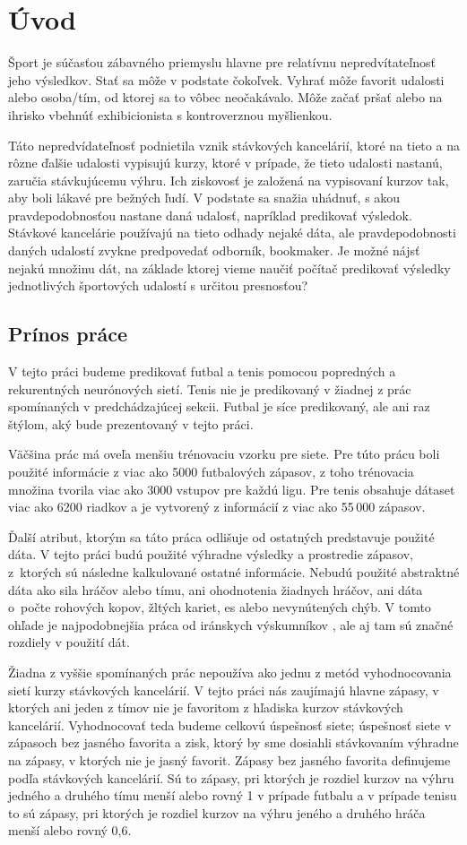 \chapter*{Úvod}
Šport je súčasťou zábavného priemyslu hlavne pre relatívnu nepredvítateľnosť jeho výsledkov. 
Stať sa môže v podstate čokoľvek. 
Vyhrať môže favorit udalosti alebo osoba/tím, od ktorej sa to vôbec neočakávalo.
Môže začať pršať alebo na ihrisko vbehnúť exhibicionista s kontroverznou myšlienkou.

Táto nepredvídateľnosť podnietila vznik stávkových kancelárií, ktoré na tieto a na rôzne ďalšie udalosti vypisujú kurzy, ktoré v prípade, že tieto udalosti nastanú, zaručia stávkujúcemu výhru.
Ich ziskovosť je založená na vypisovaní kurzov tak, aby boli lákavé pre bežných ľudí.
V podstate sa snažia uhádnuť, s akou pravdepodobnosťou nastane daná udalosť, napríklad predikovať výsledok.
Stávkové kancelárie používajú na tieto odhady nejaké dáta, ale pravdepodobnosti daných udalostí zvykne predpovedať odborník, bookmaker.
Je možné nájsť nejakú množinu dát, na základe ktorej vieme naučiť počítač predikovať výsledky jednotlivých športových udalostí s určitou presnosťou?


\section*{Prínos práce}
V tejto práci budeme predikovať futbal a tenis pomocou popredných a rekurentných neurónových sietí.
Tenis nie je predikovaný v žiadnej z prác spomínaných v predchádzajúcej sekcii.
Futbal je síce predikovaný, ale ani raz štýlom, aký bude prezentovaný v tejto práci.

Väčšina prác má oveľa menšiu trénovaciu vzorku pre siete. 
Pre túto prácu boli použité informácie z viac ako 5000 futbalových zápasov, z toho trénovacia množina tvorila viac ako 3000 vstupov pre každú ligu.
Pre tenis obsahuje dátaset viac ako 6200 riadkov a je vytvorený z informácií z viac ako 55\,000 zápasov.

Ďalší atribut, ktorým sa táto práca odlišuje od ostatných predstavuje použité dáta. V tejto práci budú použité výhradne výsledky a prostredie zápasov, z~ktorých sú následne kalkulované ostatné informácie.
Nebudú použité abstraktné dáta ako sila hráčov alebo tímu, ani ohodnotenia žiadnych hráčov, ani dáta o~počte rohových kopov, žltých kariet, es alebo nevynútených chýb. 
V tomto ohľade je najpodobnejšia práca od iránskych výskumníkov \citep{related:iran}, ale aj tam sú značné rozdiely v použití dát.

Žiadna z vyššie spomínaných prác nepoužíva ako jednu z metód vyhodnocovania sietí kurzy stávkových kancelárií.
V tejto práci nás zaujímajú hlavne zápasy, v ktorých ani jeden z tímov nie je favoritom z hľadiska kurzov stávkových kancelárií.
Vyhodnocovať teda budeme celkovú úspešnosť siete; úspešnosť siete v zápasoch bez jasného favorita a zisk, ktorý by sme dosiahli stávkovaním výhradne na zápasy, v ktorých nie je jasný favorit.
Zápasy bez jasného favorita definujeme podľa stávkových kancelárií. Sú to zápasy, pri ktorých je rozdiel kurzov na výhru jedného a druhého tímu menší alebo rovný 1 v prípade futbalu a v prípade tenisu to sú zápasy, pri ktorých je rozdiel kurzov na výhru jeného a druhého hráča menší alebo rovný 0,6.